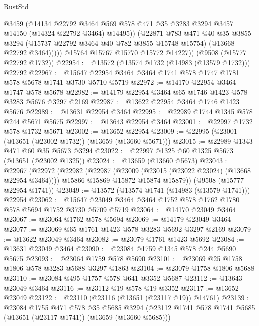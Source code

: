\begin{lexlean}{RustStd}
\begin{coremodule}
                @3459
                (@14134
                  @22792
                  @3464
                  @569
                  @578
                  @471
                  @35
                  @3283
                  @3294
                  @3457
                  @14150
                  (@14324 @22792 @3464)
                  @14495))
              (@22871
                @783
                @471
                @40
                @35
                @3855
                @3294
                (@15737 @22792 @3464 @40 @782 @3855 @15748 @15754)
                (@13668 @22792 @3464)))))
        @15764
        @15767
        @15770
        @15772
        @14227))
    (@9508 (@15777 @22792 @1732))
@22954 := @13572 (@13574 @1732 (@14983 (@13579 @1732))) @22792
@22967 := @15647 @22954 @3464 @3464 @1741 @578 @1747 @1781 @578 @5678 @1741 @3730 @5710 @5719
@22972 := @14170 @22954 @3464 @1747 @578 @5678
@22982 := @14179 @22954 @3464 @65 @1746 @1423 @578 @3283 @5676 @3297 @2169
@22987 := @13622 @22954 @3464 @1746 @1423 @5676
@22989 := @13631 @22954 @3464
@22995 := @22989 @1744 @1345 @578 @244 @5671 @5675
@22997 := @13643 @22954 @3464
@23001 := @22997 @1732 @578 @1732 @5671
@23002 := @13652 @22954
@23009 := @22995 (@23001 (@13651 (@23002 @1732)) (@13659 (@13660 @5671)))
@23015 := @22989 @1343 @471 @60 @35 @5673 @3294
@23022 := @22997 @1325 @60 @1325 @5673 (@13651 (@23002 @1325))
@23024 := @13659 (@13660 @5673)
@23043 := @22967
    (@22972
      (@22982
        (@22987 (@23009 (@23015 (@23022 @23024) (@13668 @22954 @3464))))
        @15866
        @15869
        @15872
        @15874
        @15879))
    (@9508 (@15777 @22954 @1741))
@23049 := @13572 (@13574 @1741 (@14983 (@13579 @1741))) @22954
@23062 := @15647 @23049 @3464 @3464 @1752 @578 @1762 @1780 @578 @5694 @1752 @3730 @5709 @5719
@23064 := @14170 @23049 @3464
@23067 := @23064 @1762 @578 @5694
@23069 := @14179 @23049 @3464
@23077 := @23069 @65 @1761 @1423 @578 @3283 @5692 @3297 @2169
@23079 := @13622 @23049 @3464
@23082 := @23079 @1761 @1423 @5692
@23084 := @13631 @23049 @3464
@23090 := @23084 @1759 @1345 @578 @244 @5690 @5675
@23093 := @23064 @1759 @578 @5690
@23101 := @23069 @25 @1758 @1806 @578 @3283 @5688 @3297 @1863
@23104 := @23079 @1758 @1806 @5688
@23110 := @23084 @495 @1757 @578 @641 @3352 @5687
@23112 := @13643 @23049 @3464
@23116 := @23112 @19 @578 @19 @3352
@23117 := @13652 @23049
@23122 := @23110 (@23116 (@13651 (@23117 @19)) @14761)
@23139 := @23084
    @1755
    @471
    @578
    @35
    @5685
    @3294
    (@23112 @1741 @578 @1741 @5685 (@13651 (@23117 @1741)) (@13659 (@13660 @5685)))

\end{coremodule}
\end{lexlean}
